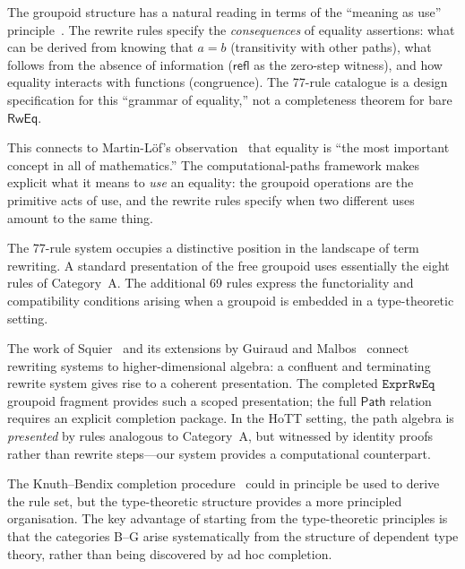\documentclass[manuscript]{BSLstyle}
\newcommand{\Path}{\mathsf{Path}}
\newcommand{\refl}{\mathsf{refl}}
\newcommand{\RwEq}{\mathsf{RwEq}}
\begin{document}
\begin{remark}
The groupoid structure has a natural reading in terms of the
``meaning as use'' principle~\cite{deQueiroz91:meaning,deQueiroz01:meaning,deQueiroz08:reduction}.
The rewrite rules specify the \emph{consequences} of equality
assertions: what can be derived from knowing that $a = b$ (transitivity
with other paths), what follows from the absence of information ($\refl$
as the zero-step witness), and how equality interacts with functions
(congruence).  The 77-rule catalogue is a design specification for this
``grammar of equality,'' not a completeness theorem for bare \(\RwEq\).

This connects to Martin-L\"of's observation~\cite{MartinLof22} that
equality is ``the most important concept in all of mathematics.''
The computational-paths framework makes explicit what it means
to \emph{use} an equality: the groupoid operations are the
primitive acts of use, and the rewrite rules specify when two
different uses amount to the same thing.
\end{remark}

\begin{remark}
The 77-rule system occupies a distinctive position in the
landscape of term rewriting.  A standard presentation of the free
groupoid uses essentially the eight rules of Category~A.  The additional
69 rules express the functoriality and compatibility conditions arising
when a groupoid is embedded in a type-theoretic setting.

The work of Squier~\cite{Squier87} and its extensions by Guiraud and
Malbos~\cite{GuiraudMalbos09} connect rewriting systems to
higher-dimensional algebra: a confluent and terminating rewrite system
gives rise to a coherent presentation.  The completed
\(\texttt{ExprRwEq}\) groupoid fragment provides such a scoped presentation;
the full \(\Path\) relation requires an explicit completion package.  In the HoTT setting, the
path algebra is \emph{presented} by rules analogous to Category~A, but
witnessed by identity proofs rather than rewrite steps---our system
provides a computational counterpart.

The Knuth--Bendix completion procedure~\cite{KnuthBendix70} could in
principle be used to derive the rule set, but the type-theoretic
structure provides a more principled organisation.  The key advantage of
starting from the type-theoretic principles is that the categories B--G
arise systematically from the structure of dependent type theory, rather
than being discovered by ad hoc completion.
\end{remark}
\end{document}
